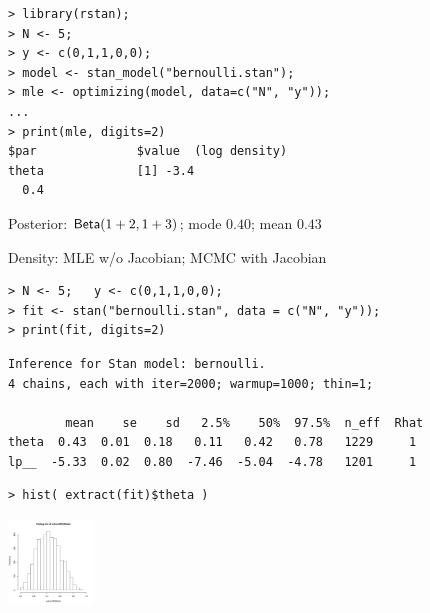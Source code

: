 \documentclass[10pt]{report}
\begin{document}

\begin{center}
\begin{minipage}[t]{0.8\textwidth}\small
\begin{Verbatim}
> library(rstan);
> N <- 5;
> y <- c(0,1,1,0,0);
> model <- stan_model("bernoulli.stan");
> mle <- optimizing(model, data=c("N", "y"));
...
> print(mle, digits=2)
$par              $value  (log density)
theta             [1] -3.4
  0.4 
\end{Verbatim}
\begin{subitemize}
\item Posterior: $\text{\sf Beta}(1+2, 1+3)$;  mode $0.40$; mean $0.43$
\item Density: MLE w/o Jacobian;  MCMC with Jacobian
\end{subitemize}
\end{minipage}
\end{center}



\begin{minipage}[t]{\textwidth}
\footnotesize
\begin{Verbatim}
> N <- 5;   y <- c(0,1,1,0,0);
> fit <- stan("bernoulli.stan", data = c("N", "y"));
> print(fit, digits=2)
\end{Verbatim}
%
\vspace*{1pt}
%
\begin{Verbatim}[fontshape=sl]
Inference for Stan model: bernoulli.
4 chains, each with iter=2000; warmup=1000; thin=1; 

        mean    se    sd   2.5%    50%  97.5%  n_eff  Rhat
theta  0.43  0.01  0.18   0.11   0.42   0.78   1229     1
lp__  -5.33  0.02  0.80  -7.46  -5.04  -4.78   1201     1
\end{Verbatim}
%
\vspace*{3pt}
%
\begin{Verbatim}
> hist( extract(fit)$theta )
\end{Verbatim}
\vspace*{-24pt}
\hfill\includegraphics[height=0.9in]{img/bernoulli-posterior-histo.pdf}
\hspace*{24pt}
\end{minipage}
\end{document}
